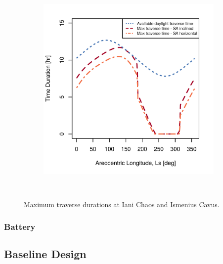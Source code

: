 \begin{figure}[h]
\begin{subfigure}[t]{\subfigureWidth}
        \includegraphics[height=\graphicsHeight]{sections/design/solar-array/plots/ismeniuscavus-75w-max-traverse-durations-for-sa-area-28m2.png}
		\label{fig:plot:sub:final-maximum-traverse-durations-ismenius-cavus}
	\end{subfigure}\\[0.8ex]
    \caption[Maximum traverse durations at Iani Chaos and Ismenius Cavus]
            {Maximum traverse durations at Iani Chaos and Ismenius Cavus.}
    \label{fig:plot:final-maximum-traverse-durations-at-missions-sites}
\vspace{-2ex}
\end{figure}

\clearpage
\subsubsection{Battery}

\subsection{Baseline Design}

